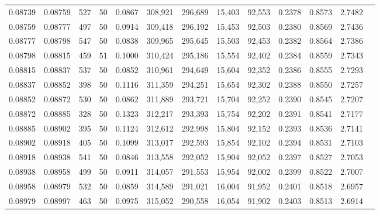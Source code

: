 \begin{tabular}{rrrrrrrrrrrrr}
0.08739 & 0.08759 &   527 &  50 &                                     0.0867 & 308,921 & 296,689 &  15,403 &  92,553 & 0.2378 & 0.8573 & 2.7482 \\
0.08759 & 0.08777 &   497 &  50 &                                     0.0914 & 309,418 & 296,192 &  15,453 &  92,503 & 0.2380 & 0.8569 & 2.7436 \\
0.08777 & 0.08798 &   547 &  50 &                                     0.0838 & 309,965 & 295,645 &  15,503 &  92,453 & 0.2382 & 0.8564 & 2.7386 \\
0.08798 & 0.08815 &   459 &  51 &                                     0.1000 & 310,424 & 295,186 &  15,554 &  92,402 & 0.2384 & 0.8559 & 2.7343 \\
0.08815 & 0.08837 &   537 &  50 &                                     0.0852 & 310,961 & 294,649 &  15,604 &  92,352 & 0.2386 & 0.8555 & 2.7293 \\
0.08837 & 0.08852 &   398 &  50 &                                     0.1116 & 311,359 & 294,251 &  15,654 &  92,302 & 0.2388 & 0.8550 & 2.7257 \\
0.08852 & 0.08872 &   530 &  50 &                                     0.0862 & 311,889 & 293,721 &  15,704 &  92,252 & 0.2390 & 0.8545 & 2.7207 \\
0.08872 & 0.08885 &   328 &  50 &                                     0.1323 & 312,217 & 293,393 &  15,754 &  92,202 & 0.2391 & 0.8541 & 2.7177 \\
0.08885 & 0.08902 &   395 &  50 &                                     0.1124 & 312,612 & 292,998 &  15,804 &  92,152 & 0.2393 & 0.8536 & 2.7141 \\
0.08902 & 0.08918 &   405 &  50 &                                     0.1099 & 313,017 & 292,593 &  15,854 &  92,102 & 0.2394 & 0.8531 & 2.7103 \\
0.08918 & 0.08938 &   541 &  50 &                                     0.0846 & 313,558 & 292,052 &  15,904 &  92,052 & 0.2397 & 0.8527 & 2.7053 \\
0.08938 & 0.08958 &   499 &  50 &                                     0.0911 & 314,057 & 291,553 &  15,954 &  92,002 & 0.2399 & 0.8522 & 2.7007 \\
0.08958 & 0.08979 &   532 &  50 &                                     0.0859 & 314,589 & 291,021 &  16,004 &  91,952 & 0.2401 & 0.8518 & 2.6957 \\
0.08979 & 0.08997 &   463 &  50 &                                     0.0975 & 315,052 & 290,558 &  16,054 &  91,902 & 0.2403 & 0.8513 & 2.6914 \\

\end{tabular}
